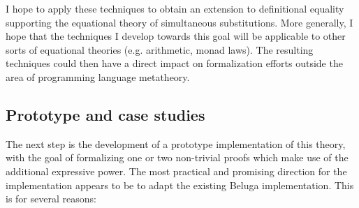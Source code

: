 \documentclass{article}
\newcommand{\LONGVERSION}[1]{{\color{light-gray}#1}}
\begin{document}
I hope to apply these techniques to obtain an extension to
definitional equality supporting the
equational theory of simultaneous substitutions. More generally, I
hope that the techniques I develop towards this goal will be applicable to other sorts
of equational theories (e.g. arithmetic, monad laws). The resulting techniques could then have a
direct impact on formalization efforts outside the area of programming
language metatheory.










\subsection{Prototype and case studies}\label{sec:prototype}
The next step is the development of a prototype implementation of this
theory, with the goal of formalizing one or two non-trivial proofs
which make use of the additional expressive power. 
The most practical and promising direction for the implementation
appears to be to adapt the existing Beluga implementation. This is for
several reasons:
\end{document}
